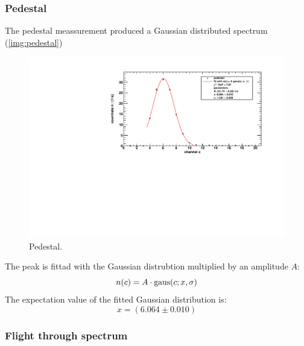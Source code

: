 \subsubsection{Pedestal}
The pedestal meassurement produced a Gaussian distributed spectrum (\autoref{img:pedestal})
\begin{figure}[H]
\begin{center}
  \includegraphics[width=\textwidth]{../img/pedestal.pdf}
  \caption{Pedestal.}
  \label{img:pedestal}
\end{center}
\end{figure}
The peak is fittad with the Gaussian distrubtion multiplied by an amplitude $A$:
\begin{equation}
    n(c) = A \cdot \operatorname{gaus}(c;x,\sigma)
\end{equation}
The expectation value of the fitted Gaussian distribution is:
\begin{equation}
    x = (6.064 \pm 0.010)
\end{equation}

\subsubsection{Flight through spectrum}
